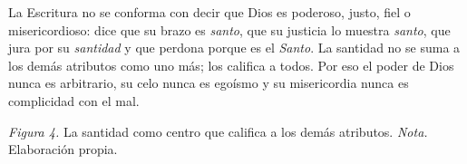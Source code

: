 \documentclass[11pt,letterpaper]{article}
\newcommand{\heb}[1]{\mbox{\foreignlanguage{hebrew}{#1}}}
\begin{document}
La Escritura no se conforma con decir que Dios es poderoso, justo, fiel o misericordioso: dice que su brazo es \emph{santo}, que su justicia lo muestra \emph{santo}, que jura por su \emph{santidad} y que perdona porque es el \emph{Santo}. La santidad no se suma a los demás atributos como uno más; los califica a todos. Por eso el poder de Dios nunca es arbitrario, su celo nunca es egoísmo y su misericordia nunca es complicidad con el mal.

\begin{center}
\par
{\footnotesize\color{gris}\textit{Figura 4.} La santidad como centro que califica a los demás atributos. \textit{Nota.} Elaboración propia.}
\end{center}
\end{document}
